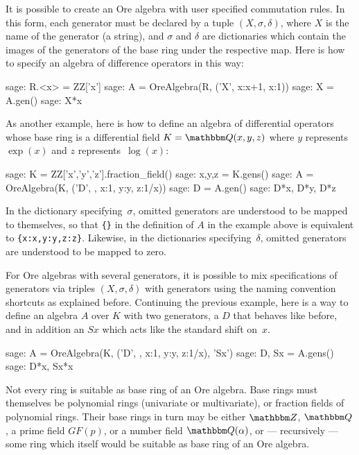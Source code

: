 \documentclass[11pt]{amsart}
\let\set\mathbbm
\begin{document}
It is possible to create an Ore algebra with user specified commutation rules.
In this form, each generator must be declared by a tuple $(X,\sigma,\delta)$, 
where $X$ is the name of the generator (a string), and $\sigma$ and $\delta$
are dictionaries which contain the images of the generators of the base
ring under the respective map. Here is how to specify an algebra of difference
operators in this way:

\begin{sageexample}
  sage: R.<x> = ZZ['x']
  sage: A = OreAlgebra(R, ('X', {x:x+1}, {x:1}))
  sage: X = A.gen()
  sage: X*x
\end{sageexample}

As another example, here is how to define an algebra of differential operators 
whose base ring is a differential field $K=\set Q(x,y,z)$ where $y$ represents
$\exp(x)$ and $z$ represents~$\log(x)$:

\begin{sageexample}
  sage: K = ZZ['x','y','z'].fraction_field()
  sage: x,y,z = K.gens()
  sage: A = OreAlgebra(K, ('D', {}, {x:1, y:y, z:1/x}))
  sage: D = A.gen()
  sage: D*x, D*y, D*z
\end{sageexample}

In the dictionary specifying~$\sigma$, omitted generators are understood to be
mapped to themselves, so that \verb|{}| in the definition of $A$ in the example
above is equivalent to \verb|{x:x,y:y,z:z}|.  Likewise, in the dictionaries
specifying~$\delta$, omitted generators are understood to be mapped to zero.

For Ore algebras with several generators, it is possible to mix specifications
of generators via triples $(X,\sigma,\delta)$ with generators using the naming
convention shortcuts as explained before. Continuing the previous example,
here is a way to define an algebra $A$ over $K$ with two generators, a $D$ 
that behaves like before, and in addition an $Sx$ which acts like the standard
shift on~$x$.

\begin{sageexample}
  sage: A = OreAlgebra(K, ('D', {}, {x:1, y:y, z:1/x}), 'Sx')
  sage: D, Sx = A.gens()
  sage: D*x, Sx*x
\end{sageexample}

Not every ring is suitable as base ring of an Ore algebra. Base rings must
themselves be polynomial rings (univariate or multivariate), or fraction 
fields of polynomial rings. Their base rings in turn may be either $\set Z$,
$\set Q$, a prime field $GF(p)$, or a number field $\set Q(\alpha)$, or
--- recursively --- some ring which itself would be suitable as base ring
of an Ore algebra. 
\end{document}

